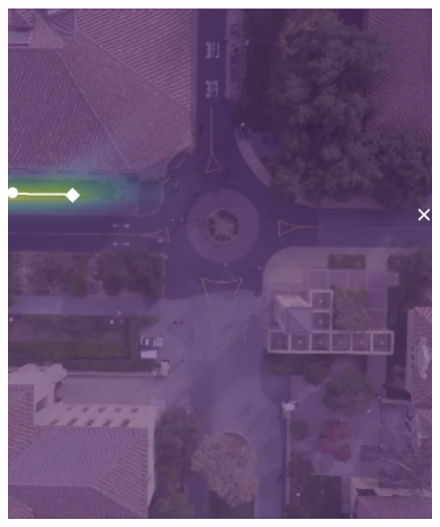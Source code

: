 \documentclass[letterpaper,10pt,conference]{ieeeconf}
\begin{document}
\begin{figure}
	\centering
\begin{minipage}[t]{0.5cm}
\end{minipage}
\begin{minipage}[t]{0.3\linewidth}
	\includegraphics[width=\linewidth]{./figures/comparison/ours_death_1_2_t=70.png}
\end{minipage}
\begin{minipage}[t]{0.3\linewidth}

\end{minipage}
\end{figure}
\end{document}
